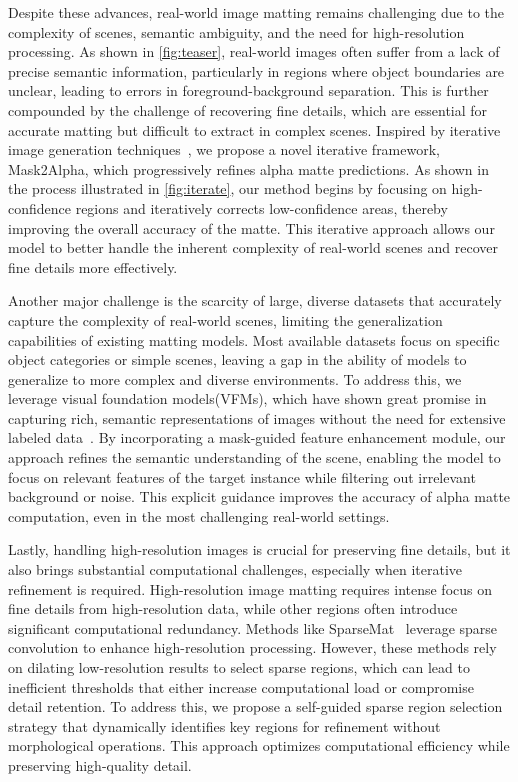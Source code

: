 Despite these advances, real-world image matting remains challenging due to the complexity of scenes, semantic ambiguity, and the need for high-resolution processing. As shown in \cref{fig:teaser}, real-world images often suffer from a lack of precise semantic information, particularly in regions where object boundaries are unclear, leading to errors in foreground-background separation. This is further compounded by the challenge of recovering fine details, which are essential for accurate matting but difficult to extract in complex scenes. Inspired by iterative image generation techniques~\cite{maskgit}, we propose a novel iterative framework, Mask2Alpha, which progressively refines alpha matte predictions. As shown in the process illustrated in \cref{fig:iterate}, our method begins by focusing on high-confidence regions and iteratively corrects low-confidence areas, thereby improving the overall accuracy of the matte. This iterative approach allows our model to better handle the inherent complexity of real-world scenes and recover fine details more effectively.

Another major challenge is the scarcity of large, diverse datasets that accurately capture the complexity of real-world scenes, limiting the generalization capabilities of existing matting models. Most available datasets focus on specific object categories or simple scenes, leaving a gap in the ability of models to generalize to more complex and diverse environments. To address this, we leverage visual foundation models(VFMs), which have shown great promise in capturing rich, semantic representations of images without the need for extensive labeled data~\cite{caron2021emerging}. By incorporating a mask-guided feature enhancement module, our approach refines the semantic understanding of the scene, enabling the model to focus on relevant features of the target instance while filtering out irrelevant background or noise. This explicit guidance improves the accuracy of alpha matte computation, even in the most challenging real-world settings.

Lastly, handling high-resolution images is crucial for preserving fine details, but it also brings substantial computational challenges, especially when iterative refinement is required. High-resolution image matting requires intense focus on fine details from high-resolution data, while other regions often introduce significant computational redundancy. Methods like SparseMat~\cite{sun2023sparsemat} leverage sparse convolution to enhance high-resolution processing. However, these methods rely on dilating low-resolution results to select sparse regions, which can lead to inefficient thresholds that either increase computational load or compromise detail retention. To address this, we propose a self-guided sparse region selection strategy that dynamically identifies key regions for refinement without morphological operations. This approach optimizes computational efficiency while preserving high-quality detail.

